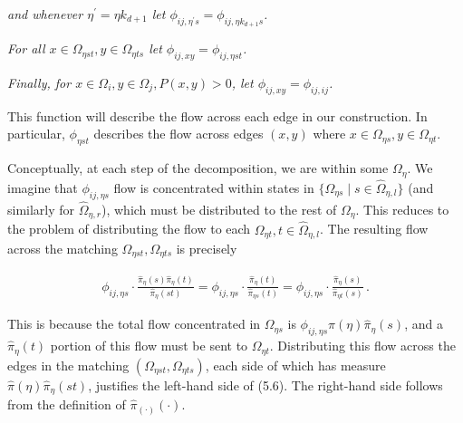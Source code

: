 \emph{and whenever $\eta^{\prime}=\eta k_{d+1}$ let $\phi_{ij,\eta^{\prime}s}=\phi_{ij,\eta k_{d+1}s}$.}\par




\emph{For all $x\in\Omega_{\eta st},y\in\Omega_{\eta ts}$ let $\phi_{ij,xy}=\phi_{ij,\eta st}$.}\par




\emph{Finally, for $x\in\Omega_{i},y\in\Omega_{j},P(x,y)>0$, let $\phi_{ij,xy}=\phi_{ij,ij}$.}\par






This function will describe the flow across each edge in our construction. In particular, $\phi_{\eta st}$ describes the flow across edges $(x,y)$ where $x\in\Omega_{\eta s},y\in\Omega_{\eta t}$.\par




Conceptually, at each step of the decomposition, we are within some $\Omega_{\eta}$. We imagine that $\phi_{ij,\eta s}$ flow is concentrated within states in $\{\Omega_{\eta s}\mid s\in\hat{\Omega}_{\eta,l}\}$ (and similarly for $\hat{\Omega}_{\eta,r}$), which must be distributed to the rest of $\Omega_{\eta}$. This reduces to the problem of distributing the flow to each $\Omega_{\eta t},t\in\hat{\Omega}_{\eta,l}$. The resulting flow across the matching $\Omega_{\eta st},\Omega_{\eta ts}$ is precisely\par


\[\begin{gathered}
\displaystyle\phi_{ij,\eta s}\cdot\frac{\hat{\pi}_{\eta}(s)\hat{\pi}_{\eta}(t)}{\hat{\pi}_{\eta}(st)} \displaystyle=\phi_{ij,\eta s}\cdot\frac{\hat{\pi}_{\eta}(t)}{\hat{\pi}_{\eta s}(t)}=\phi_{ij,\eta s}\cdot\frac{\hat{\pi}_{\eta}(s)}{\hat{\pi}_{\eta t}(s)}\,.
\end{gathered}\]


This is because the total flow concentrated in $\Omega_{\eta s}$ is $\phi_{ij,\eta s}\hat{\pi}(\eta)\hat{\pi}_{\eta}(s)$, and a $\hat{\pi}_{\eta}(t)$ portion of this flow must be sent to $\Omega_{\eta t}$. Distributing this flow across the edges in the matching $(\Omega_{\eta st},\Omega_{\eta ts})$, each side of which has measure $\hat{\pi}(\eta)\hat{\pi}_{\eta}(st)$, justifies the left-hand side of (5.6). The right-hand side follows from the definition of $\hat{\pi}_{(\cdot)}(\cdot)$.\par





